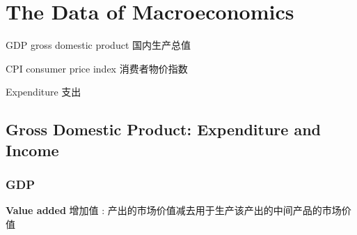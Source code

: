 \chapter{The Data of Macroeconomics}
\begin{introduction}[Keywords]
    \item GDP gross domestic product  国内生产总值
    \item CPI consumer price index 消费者物价指数
    \item Expenditure 支出
\end{introduction}
\section{Gross Domestic Product: Expenditure and Income}
\subsection{GDP}
\begin{definition}
    \textbf{Value added} 增加值 : 产出的市场价值减去用于生产该产出的中间产品的市场价值
\end{definition}

